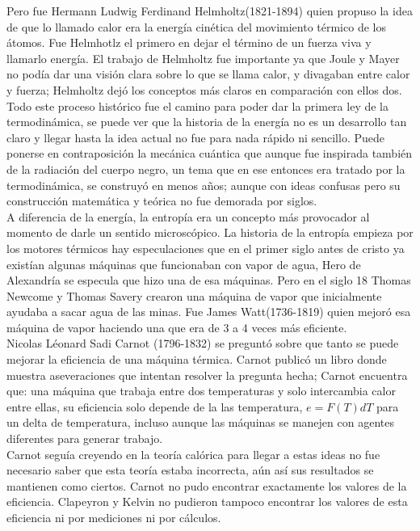Pero fue Hermann Ludwig Ferdinand Helmholtz(1821-1894) quien propuso la idea de que lo llamado calor era la energía cinética del movimiento térmico de los átomos. Fue Helmhotlz el primero en dejar el término de un fuerza viva y llamarlo energía. El trabajo de Helmholtz fue importante ya que Joule y  Mayer no podía dar una visión clara sobre lo que se llama calor, y divagaban entre calor y fuerza; Helmholtz dejó los conceptos más claros en comparación con ellos dos. 
\\
Todo este proceso histórico fue el camino para poder dar la primera ley de la termodinámica, se puede ver que la historia de la energía no es un desarrollo tan claro y llegar hasta la idea actual no fue para nada rápido ni sencillo. Puede ponerse en contraposición la mecánica cuántica que aunque fue inspirada también de la radiación del cuerpo negro, un tema que en ese entonces era tratado por la termodinámica, se construyó en menos años; aunque con ideas confusas pero su construcción matemática y teórica no fue demorada por siglos. 
\\
A diferencia de la energía, la entropía era un concepto más provocador al momento de darle un sentido microscópico. La historia de la  entropía empieza por los motores térmicos hay especulaciones que en el primer siglo antes de cristo ya existían algunas máquinas que funcionaban con vapor de agua, Hero de Alexandría se especula que hizo una de esa máquinas. Pero en el siglo 18 Thomas Newcome y Thomas Savery crearon una máquina de vapor que inicialmente ayudaba a sacar agua de las minas. Fue James Watt(1736-1819) quien mejoró esa máquina de vapor haciendo una que era de 3 a 4 veces más eficiente.
\\
Nicolas Léonard Sadi Carnot (1796-1832) se preguntó sobre que tanto se puede mejorar la eficiencia de una máquina térmica. Carnot publicó un libro donde muestra aseveraciones que intentan resolver la pregunta hecha; Carnot encuentra que: una máquina que trabaja entre dos temperaturas y solo intercambia calor entre ellas, su eficiencia solo depende de la  las temperatura, $e=F(T)dT$ para un delta de temperatura, incluso aunque las máquinas se manejen con agentes diferentes para generar trabajo. 
\\
Carnot seguía creyendo en la teoría calórica para llegar a estas ideas no fue necesario saber que esta teoría estaba incorrecta, aún así sus resultados se mantienen como ciertos. Carnot no pudo encontrar exactamente los valores de la eficiencia. Clapeyron y Kelvin no pudieron tampoco encontrar los valores de esta eficiencia ni por mediciones ni por cálculos. 
